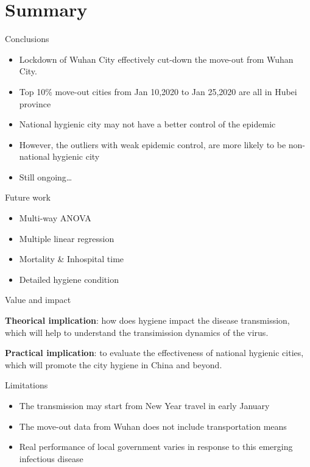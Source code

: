 \documentclass[10pt,ignorenonframetext,aspectratio=169,notes=hide,]{beamer}
\providecommand{\tightlist}{%
  \setlength{\itemsep}{0pt}\setlength{\parskip}{0pt}}
\begin{document}
\hypertarget{summary}{%
\section{Summary}\label{summary}}

\begin{frame}{Conclusions}
\protect\hypertarget{conclusions}{}

\begin{itemize}
\item
  Lockdown of Wuhan City effectively cut-down the move-out from Wuhan City.
\item
  Top 10\% move-out cities from Jan 10,2020 to Jan 25,2020 are all in Hubei province
\item
  National hygienic city may not have a better control of the epidemic
\item
  However, the outliers with weak epidemic control, are more likely to be non- national hygienic city
\item
  Still ongoing\ldots{}
\end{itemize}

\end{frame}

\begin{frame}{Future work}
\protect\hypertarget{future-work}{}

\begin{itemize}
\tightlist
\item
  Multi-way ANOVA
\item
  Multiple linear regression
\item
  Mortality \& Inhospital time
\item
  Detailed hygiene condition
\end{itemize}

\end{frame}

\begin{frame}{Value and impact}
\protect\hypertarget{value-and-impact}{}

\textbf{Theorical implication}: how does hygiene impact the disease transmission, which will help to understand the transimission dynamics of the virus.

\textbf{Practical implication}: to evaluate the effectiveness of national hygienic cities, which will promote the city hygiene in China and beyond.

\end{frame}

\begin{frame}{Limitations}
\protect\hypertarget{limitations}{}

\begin{itemize}
\item
  The transmission may start from New Year travel in early January
\item
  The move-out data from Wuhan does not include transportation means
\item
  Real performance of local government varies in response to this emerging infectious disease
\end{itemize}

\end{frame}
\end{document}
